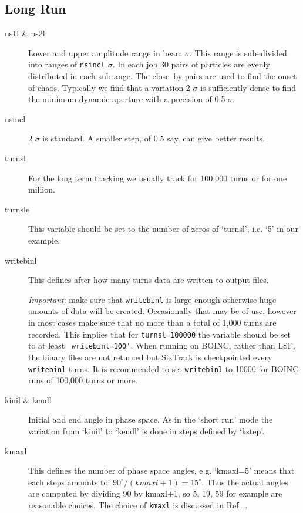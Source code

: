 \documentclass{cernatsnote}
\begin{document}
\subsection{Long Run}
\label{sec:run_six:longrun}
\begin{description}
\item [ns1l \& ns2l]
  Lower and upper amplitude range in beam $\sigma$. This range is
  sub--divided into ranges of \texttt{nsincl} $\sigma$. In each job 30 pairs of
  particles are evenly distributed in each subrange. The
  close--by pairs are used to find the onset of chaos. Typically we
  find that a variation 2 $\sigma$ is sufficiently dense to find the
  minimum dynamic aperture with a precision of 0.5 $\sigma$.
\item [nsincl] 2 $\sigma$ is standard. A smaller step, of 0.5 say, 
can give better results.
\item [turnsl]
  For the long term tracking we usually track for 100,000 turns or for
one miliion.
\item [turnsle]
  This variable should be set to the number of zeros of `turnsl',
  i.e. `5' in our example. 
\item [writebinl]
  This defines after how many turns data are written to output
  files.

  \emph{Important}: make sure that \texttt{writebinl} is large enough
  otherwise huge amounts of data will be created. Occasionally that
  may be of use, however in most cases make sure that no more than a total of
  1,000 turns are recorded. This implies that for
  \texttt{turnsl=100000} the variable should be set to at least {\tt
  writebinl=100'}.  When running on BOINC, rather than LSF, the binary files
  are not returned but SixTrack is checkpointed every \texttt{writebinl} turns.
  It is recommended to set \texttt{writebinl} to 10000 for BOINC runs of 100,000
  turns or more.
\item[kinil \& kendl]
  Initial and end angle in phase space. As in the `short run' mode
  the variation from `kinil' to `kendl' is done in steps defined by
  `kstep'. 
\item [kmaxl]
  This defines the number of phase space angles, e.g. `kmaxl=5'
  means that each steps amounts to: $90^\circ/(kmaxl+1)=15^\circ$.
  Thus the actual angles are computed by dividing 90
  by kmaxl+1, so 5, 19, 59 for example are reasonable choices.
  The choice of \texttt{kmaxl} is discussed in Ref.~\cite{fandmpaper}.
\end{description}
\end{document}
